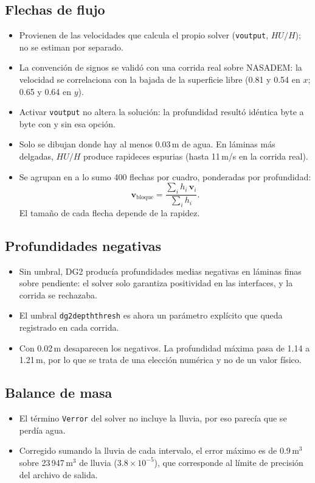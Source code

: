 \documentclass[11pt,a4paper]{article}
\begin{document}
\subsection*{Flechas de flujo}
\begin{itemize}
  \item Provienen de las velocidades que calcula el propio solver (\texttt{voutput}, $HU/H$); no se estiman por separado.
  \item La convención de signos se validó con una corrida real sobre NASADEM: la velocidad se correlaciona con la bajada de la superficie libre (0.81 y 0.54 en $x$; 0.65 y 0.64 en $y$).
  \item Activar \texttt{voutput} no altera la solución: la profundidad resultó idéntica byte a byte con y sin esa opción.
  \item Solo se dibujan donde hay al menos 0.03\,m de agua. En láminas más delgadas, $HU/H$ produce rapideces espurias (hasta 11\,m/s en la corrida real).
  \item Se agrupan en a lo sumo 400 flechas por cuadro, ponderadas por profundidad:
  \[
    \mathbf{v}_{\text{bloque}} = \frac{\sum_i h_i\,\mathbf{v}_i}{\sum_i h_i}.
  \]
  El tamaño de cada flecha depende de la rapidez.
\end{itemize}

\subsection*{Profundidades negativas}
\begin{itemize}
  \item Sin umbral, DG2 producía profundidades medias negativas en láminas finas sobre pendiente: el solver solo garantiza positividad en las interfaces, y la corrida se rechazaba.
  \item El umbral \texttt{dg2depththresh} es ahora un parámetro explícito que queda registrado en cada corrida.
  \item Con 0.02\,m desaparecen los negativos. La profundidad máxima pasa de 1.14 a 1.21\,m, por lo que se trata de una elección numérica y no de un valor físico.
\end{itemize}

\subsection*{Balance de masa}
\begin{itemize}
  \item El término \texttt{Verror} del solver no incluye la lluvia, por eso parecía que se perdía agua.
  \item Corregido sumando la lluvia de cada intervalo, el error máximo es de 0.9\,m$^3$ sobre 23\,947\,m$^3$ de lluvia ($3.8\times10^{-5}$), que corresponde al límite de precisión del archivo de salida.
\end{itemize}
\end{document}
